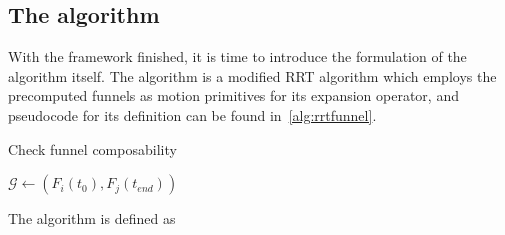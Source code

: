 


\subsection{The \rrtfunnel{} algorithm}

With the framework finished, it is time to introduce the formulation of the
\rrtfunnel{} algorithm itself. The \rrtfunnel{} algorithm is a modified \ac{RRT}
algorithm which employs the precomputed funnels as motion primitives for its
expansion operator, and pseudocode for its definition can be found
in~\cref{alg:rrtfunnel}.

\begin{algorithm}
  \caption{Check funnel composability}
  \label{alg:create-funnel-graph}
  \DontPrintSemicolon \SetAlgoNoLine

   

   {  {
       { \(\mathcal{G} \leftarrow{}
        \left( F_{i}(t_{0}), F_{j}(t_{end}) \right)\) } \; }\; }\;

\end{algorithm}

The \rrtfunnel{} algorithm is defined as

